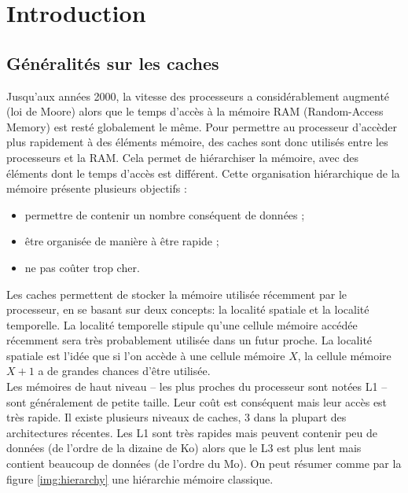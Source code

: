 \chapter{Introduction}

\section{Généralités sur les caches}

Jusqu'aux années 2000, la vitesse des processeurs a considérablement augmenté (loi de Moore) alors que le temps d'accès à la mémoire RAM (Random-Access Memory) est resté globalement le même. Pour permettre au processeur d'accèder plus rapidement à des éléments mémoire, des caches sont donc utilisés entre les processeurs et la RAM. Cela permet de hiérarchiser la mémoire, avec des éléments dont le temps d'accès est différent. Cette organisation hiérarchique de la mémoire présente plusieurs objectifs : \\
\begin{itemize}
\item permettre de contenir un nombre conséquent de données ;
\item être organisée de manière à être rapide ;
\item ne pas coûter trop cher.\\ 
\end{itemize}

Les caches permettent de stocker la mémoire utilisée récemment par le processeur, en se basant sur deux concepts: la localité spatiale et la localité temporelle. La localité temporelle stipule qu'une cellule mémoire accédée récemment sera très probablement utilisée dans un futur proche. La localité spatiale est l'idée que si l'on accède à une cellule mémoire $X$, la cellule mémoire $X+1$ a de grandes chances d'être utilisée. \\

Les mémoires de haut niveau -- les plus proches du processeur sont notées L1 -- sont généralement de petite taille. Leur coût est conséquent mais leur accès est très rapide. Il existe plusieurs niveaux de caches, $3$ dans la plupart des architectures récentes. Les L1 sont très rapides mais peuvent contenir peu de données (de l'ordre de la dizaine de Ko) alors que le L3 est plus lent mais contient beaucoup de données (de l'ordre du Mo). On peut résumer comme par la figure \ref{img:hierarchy} une hiérarchie mémoire classique.\\

